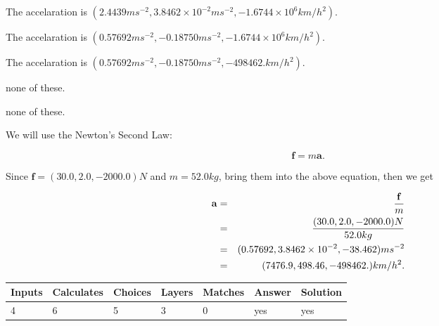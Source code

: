 \documentclass[12pt]{article}
\begin{document}
 
The accelaration is
$(
2.4439ms^{-2},
3.8462 \times 10^{-2}ms^{-2},
-1.6744 \times 10^{6}km/h^2
).
$
 
 
The accelaration is
$(
0.57692ms^{-2},
-0.18750ms^{-2},
-1.6744 \times 10^{6}km/h^2
).
$
 
 
The accelaration is
$(
0.57692ms^{-2},
-0.18750ms^{-2},
-498462.km/h^2
).
$
 
 
none of these.
 
 
\noindent{}
 
 
none of these.
 
 
\noindent{}
 
 
 
 
 
 
\noindent{}
 
 

We will use the Newton's Second Law:
 
\[
\mathbf{f}=m\mathbf{a}.
\]
 
Since $\mathbf{f}=( %
30.0,  %
2.0,  %
-2000.0 )N$
and $m= %
52.0kg$, bring them into the above equation, then we get
 
\begin{eqnarray*}
\mathbf{a}&=&\frac{\mathbf{f}}m  \\
&=&\frac{(
30.0 ,
2.0 ,
-2000.0 )N
}{ %
52.0 kg}  \\
&=&(
0.57692 ,
3.8462 \times 10^{-2},
-38.462
)ms^{-2} \\
&=&(
7476.9 ,
498.46 ,
-498462.
)km/h^2.
\end{eqnarray*}
 
 
 
\noindent{}
 
 

 
\vspace{0.3in}
   
   
   
   
\noindent\begin{tabular}{|l|l|l|l|l|l|l|}
 \hline
Inputs & Calculates & Choices & Layers & Matches & Answer & Solution \\ \hline
           4  & 
           6  & 
           5
  & 
           3  & 
           0  & 
  yes & 
  yes 
  \\ \hline
 \end{tabular}
   
\end{document}
